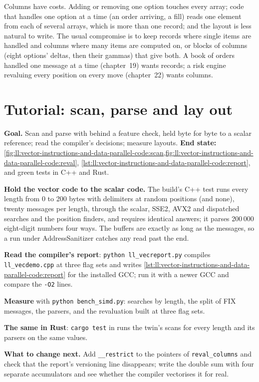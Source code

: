 Columns have costs. Adding or removing one option touches every array; code that handles one option at a time (an order
arriving, a fill) reads one element from each of several arrays, which is more  than one record; and the
layout is less natural to write. The usual compromise is to keep records where single items are handled and columns where
many items are computed on, or blocks of columns (eight options' deltas, then their gammas) that give both. A book of orders
handled one message at a time (chapter~19) wants records; a risk engine revaluing every position on every move (chapter~22)
wants columns.

\section{Tutorial: scan, parse and lay out}\label{tut:ll:vector-instructions-and-data-parallel-code:tut}

\begin{tutorial}
\textbf{Goal.} Scan and parse with  behind a feature check, held byte for byte to a scalar reference; read
the compiler's decisions; measure layouts. \textbf{End state:}
\cref{fig:ll:vector-instructions-and-data-parallel-code:scan,fig:ll:vector-instructions-and-data-parallel-code:reval},
\cref{lst:ll:vector-instructions-and-data-parallel-code:report}, and green tests in C++ and Rust.
\begin{tutsteps}
\item \textbf{Hold the vector code to the scalar code.} The build's C++ test runs every length from 0 to 200 bytes with
delimiters at random positions (and none), twenty messages per length, through the scalar, SSE2, AVX2 and dispatched
searches and the position finders, and requires identical answers; it parses 200\,000 eight-digit numbers four ways. The
buffers are exactly as long as the messages, so a run under AddressSanitizer catches any read past the end.
\item \textbf{Read the compiler's report}: \texttt{python ll\_vecreport.py} compiles \texttt{ll\_vecdemo.cpp} at three flag
sets and writes \cref{lst:ll:vector-instructions-and-data-parallel-code:report} for the installed GCC; run it with a newer
GCC and compare the \texttt{-O2} lines.
\item \textbf{Measure} with \texttt{python bench\_simd.py}: searches by length, the split of FIX messages, the parsers, and
the revaluation built at three flag sets.
\item \textbf{The same in Rust}: \texttt{cargo test} in  runs the twin's scans for every length
and its parsers on the same values.
\end{tutsteps}
\textbf{What to change next.} Add \texttt{\_\_restrict} to the pointers of \texttt{reval\_columns} and check that the
report's versioning line disappears; write the double sum with four separate accumulators and see whether the compiler
vectorises it for real.
\end{tutorial}

